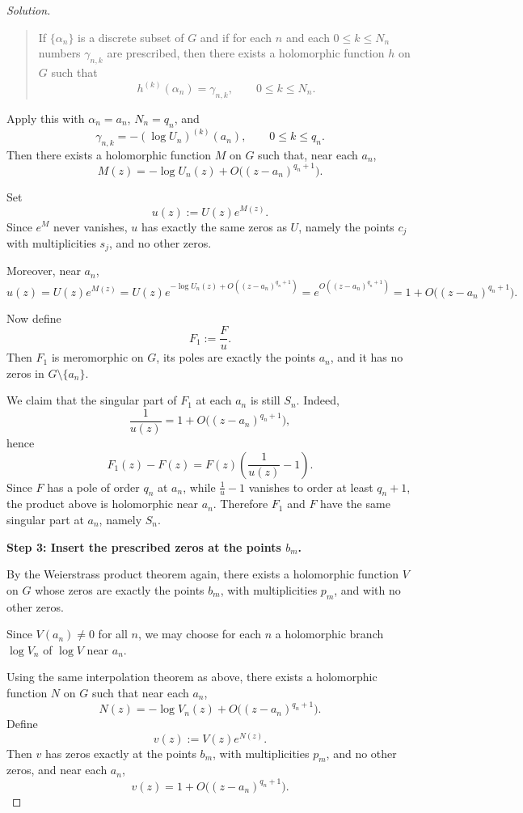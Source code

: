 \documentclass[12pt, a4paper]{report}
\theoremstyle{spaced}
\begin{document}
\begin{proof}[Solution]
	\begin{quote}
		If $\{\alpha_n\}$ is a discrete subset of $G$ and if for each $n$ and each $0\le k\le N_n$ numbers $\gamma_{n,k}$ are prescribed, then there exists a holomorphic function $h$ on $G$ such that
		\[
			h^{(k)}(\alpha_n)=\gamma_{n,k}, \qquad 0\le k\le N_n.
		\]
	\end{quote}

	Apply this with $\alpha_n=a_n$, $N_n=q_n$, and
	\[
		\gamma_{n,k}=-(\log U_n)^{(k)}(a_n), \qquad 0\le k\le q_n.
	\]
	Then there exists a holomorphic function $M$ on $G$ such that, near each $a_n$,
	\[
		M(z)=-\log U_n(z)+O\bigl((z-a_n)^{q_n+1}\bigr).
	\]

	Set
	\[
		u(z):=U(z)e^{M(z)}.
	\]
	Since $e^M$ never vanishes, $u$ has exactly the same zeros as $U$, namely the points $c_j$ with multiplicities $s_j$, and no other zeros.

	Moreover, near $a_n$,
	\[
		u(z)=U(z)e^{M(z)}
		=U(z)e^{-\log U_n(z)+O((z-a_n)^{q_n+1})}
		=e^{O((z-a_n)^{q_n+1})}
		=1+O\bigl((z-a_n)^{q_n+1}\bigr).
	\]

	Now define
	\[
		F_1:=\frac{F}{u}.
	\]
	Then $F_1$ is meromorphic on $G$, its poles are exactly the points $a_n$, and it has no zeros in $G\setminus\{a_n\}$.

	We claim that the singular part of $F_1$ at each $a_n$ is still $S_n$. Indeed,
	\[
		\frac1{u(z)}=1+O\bigl((z-a_n)^{q_n+1}\bigr),
	\]
	hence
	\[
		F_1(z)-F(z)=F(z)\left(\frac1{u(z)}-1\right).
	\]
	Since $F$ has a pole of order $q_n$ at $a_n$, while $\frac1u-1$ vanishes to order at least $q_n+1$, the product above is holomorphic near $a_n$. Therefore $F_1$ and $F$ have the same singular part at $a_n$, namely $S_n$.

	\medskip
	\noindent \textbf{Step 3: Insert the prescribed zeros at the points $b_m$.}

	By the Weierstrass product theorem again, there exists a holomorphic function $V$ on $G$ whose zeros are exactly the points $b_m$, with multiplicities $p_m$, and with no other zeros.

	Since $V(a_n)\neq 0$ for all $n$, we may choose for each $n$ a holomorphic branch $\log V_n$ of $\log V$ near $a_n$.

	Using the same interpolation theorem as above, there exists a holomorphic function $N$ on $G$ such that near each $a_n$,
	\[
		N(z)=-\log V_n(z)+O\bigl((z-a_n)^{q_n+1}\bigr).
	\]
	Define
	\[
		v(z):=V(z)e^{N(z)}.
	\]
	Then $v$ has zeros exactly at the points $b_m$, with multiplicities $p_m$, and no other zeros, and near each $a_n$,
	\[
		v(z)=1+O\bigl((z-a_n)^{q_n+1}\bigr).
	\]


\end{proof}
\end{document}
